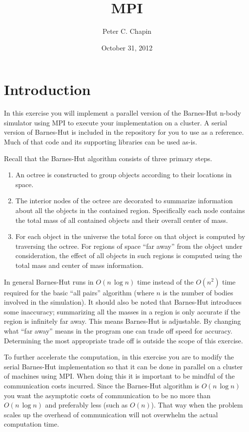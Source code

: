 \documentclass{article}
\begin{document}
\title{MPI}
\author{Peter C. Chapin}
\date{October 31, 2012}
\maketitle

\section{Introduction}
\label{sec:introduction}

In this exercise you will implement a parallel version of the Barnes-Hut n-body simulator using
MPI to execute your implementation on a cluster. A serial version of Barnes-Hut is included in
the repository for you to use as a reference. Much of that code and its supporting libraries can
be used as-is.

Recall that the Barnes-Hut algorithm consists of three primary steps.
\begin{enumerate}
\item An octree is constructed to group objects according to their locations in space.
\item The interior nodes of the octree are decorated to summarize information about all the
  objects in the contained region. Specifically each node contains the total mass of all
  contained objects and their overall center of mass.
\item For each object in the universe the total force on that object is computed by traversing
  the octree. For regions of space ``far away'' from the object under consideration, the effect
  of all objects in such regions is computed using the total mass and center of mass
  information.
\end{enumerate}

In general Barnes-Hut runs in $O(n\,\log n)$ time instead of the $O(n^2)$ time required for the
basic ``all pairs'' algorithm (where $n$ is the number of bodies involved in the simulation). It
should also be noted that Barnes-Hut introduces some inaccuracy; summarizing all the masses in a
region is only accurate if the region is infinitely far away. This means Barnes-Hut is
adjustable. By changing what ``far away'' means in the program one can trade off speed for
accuracy. Determining the most appropriate trade off is outside the scope of this exercise.

To further accelerate the computation, in this exercise you are to modify the serial Barnes-Hut
implementation so that it can be done in parallel on a cluster of machines using MPI. When doing
this it is important to be mindful of the communication costs incurred. Since the Barnes-Hut
algorithm is $O(n\,\log n)$ you want the asymptotic costs of communication to be no more than
$O(n\,\log n)$ and preferably less (such as $O(n)$). That way when the problem scales up the
overhead of communication will not overwhelm the actual computation time.
\end{document}
